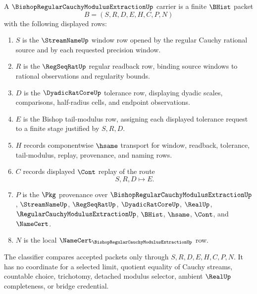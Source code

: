 \begin{definition}
\label{def:bishop-regular-cauchy-modulus-extraction-carrier}
A $\BishopRegularCauchyModulusExtractionUp$ carrier is a finite $\BHist$ packet
$$
B=(S,R,D,E,H,C,P,N)
$$
with the following displayed rows:
\begin{enumerate}
\item $S$ is the $\StreamNameUp$ window row opened by the regular Cauchy rational source and by each requested precision window.
\item $R$ is the $\RegSeqRatUp$ regular readback row, binding source windows to rational observations and regularity bounds.
\item $D$ is the $\DyadicRatCoreUp$ tolerance row, displaying dyadic scales, comparisons, half-radius cells, and endpoint observations.
\item $E$ is the Bishop tail-modulus row, assigning each displayed tolerance request to a finite stage justified by $S,R,D$.
\item $H$ records componentwise $\hsame$ transport for window, readback, tolerance, tail-modulus, replay, provenance, and naming rows.
\item $C$ records displayed $\Cont$ replay of the route
$$
S,R,D \longmapsto E .
$$
\item $P$ is the $\Pkg$ provenance over $\BishopRegularCauchyModulusExtractionUp$, $\StreamNameUp$, $\RegSeqRatUp$, $\DyadicRatCoreUp$, $\RealUp$, $\RegularCauchyModulusExtractionUp$, $\BHist$, $\hsame$, $\Cont$, and $\NameCert$.
\item $N$ is the local $\NameCert_{\BishopRegularCauchyModulusExtractionUp}$ row.
\end{enumerate}
The classifier compares accepted packets only through $S,R,D,E,H,C,P,N$. It has no coordinate for a selected limit, quotient equality of Cauchy streams, countable choice, trichotomy, detached modulus selector, ambient $\RealUp$ completeness, or bridge credential.
\end{definition}

